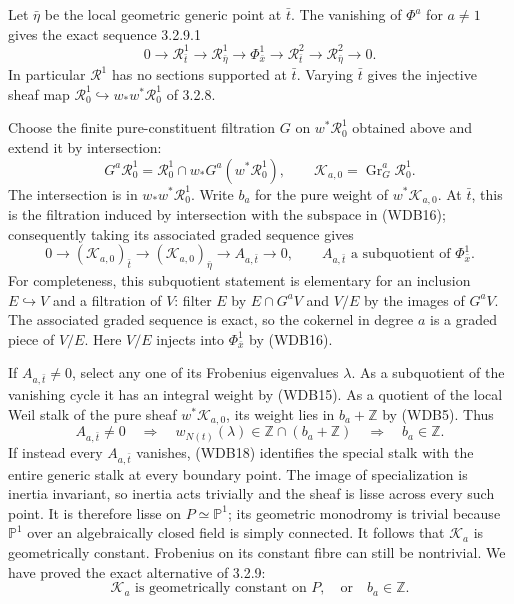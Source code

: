 Let \(\bar\eta\) be the local geometric generic point at
\(\bar t\). The vanishing of \(\Phi^a\) for \(a\ne1\)
gives the exact sequence 3.2.9.1
\[
 0\to\mathcal R^1_{\bar t}
   \to\mathcal R^1_{\bar\eta}
   \to\Phi^1_{\bar x}
   \to\mathcal R^2_{\bar t}
   \to\mathcal R^2_{\bar\eta}\to0.
 \tag{WDB16}
\]
In particular \(\mathcal R^1\) has no sections supported at
\(\bar t\). Varying \(\bar t\) gives the injective sheaf map
\(\mathcal R^1_0\hookrightarrow w_*w^*\mathcal R^1_0\)
of 3.2.8.

Choose the finite pure-constituent filtration \(G\) on
\(w^*\mathcal R^1_0\) obtained above and extend it by intersection:
\[
 G^a\mathcal R^1_0
 =\mathcal R^1_0\cap w_*G^a(w^*\mathcal R^1_0),
 \qquad \mathcal K_{a,0}=\operatorname{Gr}_G^a\mathcal R^1_0.
 \tag{WDB17}
\]
The intersection is in \(w_*w^*\mathcal R^1_0\).
Write \(b_a\) for the pure weight of \(w^*\mathcal K_{a,0}\).
At \(\bar t\), this is the filtration induced by intersection
with the subspace in (WDB16); consequently taking its associated
graded sequence gives
\[
 0\to (\mathcal K_{a,0})_{\bar t}
 \to (\mathcal K_{a,0})_{\bar\eta}
 \to A_{a,\bar t}\to0,
 \qquad A_{a,\bar t}
      \text{ a subquotient of }\Phi^1_{\bar x}.
 \tag{WDB18}
\]
For completeness, this subquotient statement is elementary for an
inclusion \(E\hookrightarrow V\) and a filtration of \(V\):
filter \(E\) by \(E\cap G^aV\) and \(V/E\) by the images
of \(G^aV\). The associated graded sequence is exact, so the
cokernel in degree \(a\) is a graded piece of \(V/E\).
Here \(V/E\) injects into \(\Phi^1_{\bar x}\) by (WDB16).

If \(A_{a,\bar t}\ne0\), select any one of its Frobenius
eigenvalues \(\lambda\). As a subquotient of the vanishing cycle
it has an integral weight by (WDB15). As a quotient of the local
Weil stalk of the pure sheaf \(w^*\mathcal K_{a,0}\), its weight
lies in \(b_a+\mathbb Z\) by (WDB5). Thus
\[
 A_{a,\bar t}\ne0\quad\Longrightarrow\quad
 w_{N(t)}(\lambda)\in\mathbb Z\cap(b_a+\mathbb Z)
 \quad\Longrightarrow\quad b_a\in\mathbb Z.
 \tag{WDB19}
\]
If instead every \(A_{a,\bar t}\) vanishes, (WDB18) identifies
the special stalk with the entire generic stalk at every boundary
point. The image of specialization is inertia invariant, so inertia
acts trivially and the sheaf is lisse across every such point. It is
therefore lisse on \(P\simeq\mathbb P^1\); its geometric monodromy
is trivial because \(\mathbb P^1\) over an algebraically closed
field is simply connected. It follows that \(\mathcal K_a\) is
geometrically constant. Frobenius on its constant fibre can still
be nontrivial. We have proved the exact alternative of 3.2.9:
\[
 \mathcal K_a\text{ is geometrically constant on }P,
 \quad\text{or}\quad b_a\in\mathbb Z.
 \tag{WDB20}
\]

